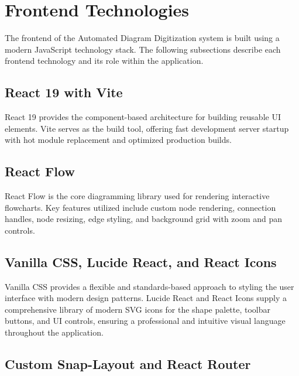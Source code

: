 \section{Frontend Technologies}
\label{sec:frontend-tech}

The frontend of the Automated Diagram Digitization system is 
built using a modern JavaScript technology stack. 
The following subsections describe each frontend technology 
and its role within the application.

\subsection{React 19 with Vite}
\label{subsec:react-vite}

React 19 provides the component-based architecture for building 
reusable UI elements. Vite serves as the build tool, offering 
fast development server startup with hot module replacement and 
optimized production builds.

\subsection{React Flow}
\label{subsec:reactflow}

React Flow is the core diagramming library used for rendering 
interactive flowcharts. Key features utilized include custom 
node rendering, connection handles, node resizing, edge styling, 
and background grid with zoom and pan controls.

\subsection{Vanilla CSS, Lucide React, and React Icons}
\label{subsec:css-lucide}

Vanilla CSS provides a flexible and standards-based approach to styling the user interface with modern design patterns. Lucide React and React Icons supply a comprehensive library of modern SVG icons for the shape palette, toolbar buttons, and UI controls, ensuring a professional and intuitive visual language throughout the application.

\subsection{Custom Snap-Layout and React Router}
\label{subsec:layout-router}


